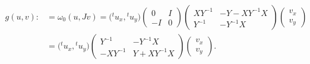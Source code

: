 \documentclass[10pt,a4paper]{amsart}
\numberwithin{equation}{section}
\begin{document}
\begin{align}
g(u, v):&=\omega_0(u,Jv)=\bigl({}^tu_x, {}^tu_y\bigr)
\begin{pmatrix}
0 & I \\
-I & 0
\end{pmatrix}
\begin{pmatrix}
XY^{-1} & -Y-XY^{-1}X \\
Y^{-1} & -Y^{-1}X
\end{pmatrix}
\begin{pmatrix}
v_x\\
v_y
\end{pmatrix}\nonumber\\
&=\bigl({}^tu_x, {}^tu_y\bigr)
\begin{pmatrix}
Y^{-1} & -Y^{-1}X \\
-XY^{-1} & Y+XY^{-1}X
\end{pmatrix}
\begin{pmatrix}
v_x\\
v_y
\end{pmatrix}.\label{g}
\end{align}
\end{document}
